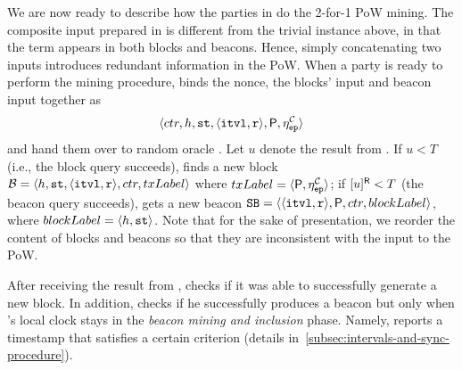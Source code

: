 We are now ready to describe how the parties in \timekeeper do the 2-for-1 PoW mining.
%
The composite input prepared in \timekeeper is different from the trivial instance above, in that the term \protocolTime{\interval}{\round} appears in both blocks and beacons.
%
Hence, simply concatenating two inputs introduces redundant information in the PoW.
%
When a party \party is ready to perform the mining procedure, \party binds the nonce, the blocks' input and beacon input together as
%
\[ \langle ctr, h, \mathtt{st}, \langle \mathtt{itvl}, \mathtt{r} \rangle, \mathsf{P}, \eta^\mathcal{C}_\mathtt{ep} \rangle \]
%
and hand them over to random oracle \funcRO.
%
Let $u$ denote the result from \funcRO.
%
If $u < T$ (i.e., the block query succeeds), \party finds a new block $\mathcal{B} = \langle h, \mathtt{st}, \langle \mathtt{itvl}, \mathtt{r} \rangle, ctr, txLabel \rangle$ where $txLabel = \langle \mathsf{P}, \eta^\mathcal{C}_\mathtt{ep} \rangle$;
%
if $[u]^{\mathsf{R}} < T$ (the beacon query succeeds), \party gets a new beacon $\mathtt{SB} = \langle \langle \mathtt{itvl}, \mathtt{r} \rangle, \mathsf{P}, ctr,\allowbreak blockLabel \rangle$, where $blockLabel = \langle h, \mathtt{st} \rangle$.
%
Note that for the sake of presentation, we reorder the content of blocks and beacons so that they are inconsistent with the input to the PoW.

After receiving the result from \funcRO, \party checks if it was able to successfully generate a new block.
%
In addition, \party checks if he successfully produces a beacon but only when \party's local clock stays in the \emph{beacon mining and inclusion} phase.
%
Namely, \party reports a timestamp that satisfies a certain criterion (details in~\cref{subsec:intervals-and-sync-procedure}).
